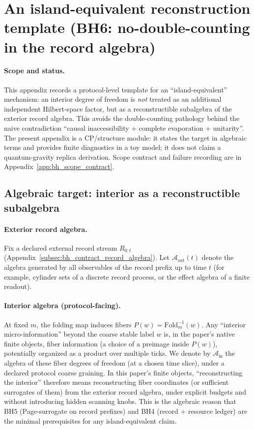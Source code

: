 \section{An island-equivalent reconstruction template (BH6: no-double-counting in the record algebra)}
\label{app:bh_island_equiv}

\paragraph{Scope and status.}
\AuditTag This appendix records a protocol-level template for an ``island-equivalent'' mechanism:
an interior degree of freedom is \emph{not} treated as an additional independent Hilbert-space factor,
but as a reconstructible subalgebra of the exterior record algebra.
This avoids the double-counting pathology behind the naive contradiction
``causal inaccessibility + complete evaporation + unitarity''.
The present appendix is a CP/structure module: it states the target in algebraic terms and provides
finite diagnostics in a toy model; it does not claim a quantum-gravity replica derivation.
Scope contract and failure recording are in Appendix~\ref{app:bh_scope_contract}.

\subsection{Algebraic target: interior as a reconstructible subalgebra}
\label{subsec:bh6_algebraic_target}

\paragraph{Exterior record algebra.}
Fix a declared external record stream $R_{0:t}$ (Appendix~\ref{subsec:bh_contract_record_algebra}).
Let $\mathcal{A}_{\mathrm{out}}(t)$ denote the algebra generated by all observables of the record prefix up to time $t$
(for example, cylinder sets of a discrete record process, or the effect algebra of a finite readout).

\paragraph{Interior algebra (protocol-facing).}
\InterfaceTag At fixed $m$, the folding map induces fibers $P(w)=\mathrm{Fold}_m^{-1}(w)$.
Any ``interior micro-information'' beyond the coarse stable label $w$ is, in the paper's native finite objects,
fiber information (a choice of a preimage inside $P(w)$), potentially organized as a product over multiple ticks.
We denote by $\mathcal{A}_{\mathrm{in}}$ the algebra of these fiber degrees of freedom (at a chosen time slice),
under a declared protocol coarse graining.
\AuditTag In this paper's finite objects, ``reconstructing the interior'' therefore means reconstructing fiber coordinates (or sufficient surrogates of them) from the exterior record algebra, under explicit budgets and without introducing hidden scanning knobs.
This is the algebraic reason that BH5 (Page-surrogate on record prefixes) and BH4 (record + resource ledger) are the minimal prerequisites for any island-equivalent claim.

